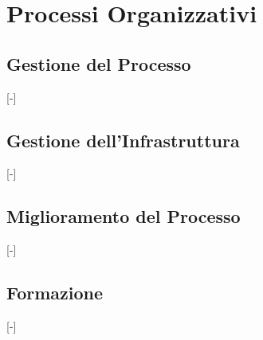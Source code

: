 \section{Processi Organizzativi}

\subsection{Gestione del Processo}
[-]

\subsection{Gestione dell'Infrastruttura}
[-]

\subsection{Miglioramento del Processo}
[-]

\subsection{Formazione}
[-]